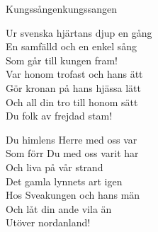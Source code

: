 \begin{song}{Kungssången}{kungssangen}
\begin{vers}
Ur svenska hjärtans djup en gång\\
En samfälld och en enkel sång\\
Som går till kungen fram!   \\
Var honom trofast och hans ätt\\
Gör kronan på hans hjässa lätt\\
Och all din tro till honom sätt\\
Du folk av frejdad stam!\\
\end{vers}
\begin{vers}
Du himlens Herre med oss var\\
Som förr Du med oss varit har\\
Och liva på vår strand\\
Det gamla lynnets art igen\\
Hos Sveakungen och hans män\\
Och låt din ande vila än\\
Utöver nordanland!\\
\end{vers}
\end{song}
